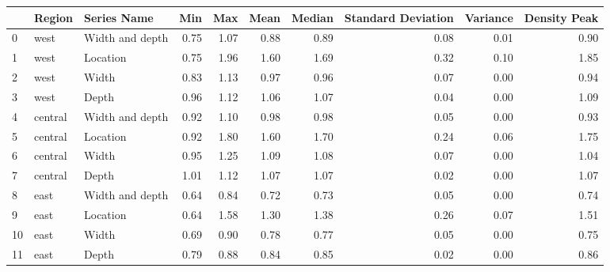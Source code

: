 \begin{tabular}{lllrrrrrrr}
\toprule
{} &   Region &      Series Name &   Min &   Max &  Mean &  Median &  Standard Deviation &  Variance &  Density Peak \\
\midrule
0  &     west &  Width and depth &  0.75 &  1.07 &  0.88 &    0.89 &                0.08 &      0.01 &          0.90 \\
1  &     west &         Location &  0.75 &  1.96 &  1.60 &    1.69 &                0.32 &      0.10 &          1.85 \\
2  &     west &            Width &  0.83 &  1.13 &  0.97 &    0.96 &                0.07 &      0.00 &          0.94 \\
3  &     west &            Depth &  0.96 &  1.12 &  1.06 &    1.07 &                0.04 &      0.00 &          1.09 \\
\midrule
4  &  central &  Width and depth &  0.92 &  1.10 &  0.98 &    0.98 &                0.05 &      0.00 &          0.93 \\
5  &  central &         Location &  0.92 &  1.80 &  1.60 &    1.70 &                0.24 &      0.06 &          1.75 \\
6  &  central &            Width &  0.95 &  1.25 &  1.09 &    1.08 &                0.07 &      0.00 &          1.04 \\
7  &  central &            Depth &  1.01 &  1.12 &  1.07 &    1.07 &                0.02 &      0.00 &          1.07 \\
\midrule
8  &     east &  Width and depth &  0.64 &  0.84 &  0.72 &    0.73 &                0.05 &      0.00 &          0.74 \\
9  &     east &         Location &  0.64 &  1.58 &  1.30 &    1.38 &                0.26 &      0.07 &          1.51 \\
10 &     east &            Width &  0.69 &  0.90 &  0.78 &    0.77 &                0.05 &      0.00 &          0.75 \\
11 &     east &            Depth &  0.79 &  0.88 &  0.84 &    0.85 &                0.02 &      0.00 &          0.86 \\
\bottomrule
\end{tabular}
